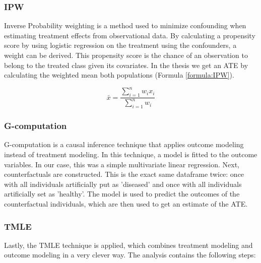\subsubsection{IPW}

Inverse Probability weighting is a method used to minimize confounding when estimating treatment effects from observational data.
By calculating a propensity score by using logistic regression on the treatment using the confounders, a weight can be derived.
This propensity score is the chance of an observation to belong to the treated class given its covariates.
In the thesis we get an ATE by calculating the weighted mean both populations (Formula \ref{formula:IPW}).

\begin{equation}
    \bar{x} = \frac{\sum_{i=1}^{n} w_i x_i}{\sum_{i=1}^{n} w_i}
    \label{formula:IPW}
\end{equation}

\subsubsection{G-computation}

G-computation is a causal inference technique that applies outcome modeling instead of treatment modeling.
In this technique, a model is fitted to the outcome variables.
In our case, this was a simple multivariate linear regression.
Next, counterfactuals are constructed.
This is the exact same dataframe twice: once with all individuals artificially put as 'diseased' and once with all individuals artificially set as 'healthy'.
The model is used to predict the outcomes of the counterfactual individuals, which are then used to get an estimate of the ATE.

\subsubsection{TMLE}

Lastly, the TMLE technique is applied, which combines treatment modeling and outcome modeling in a very clever way.
The analysis contains the following steps:

